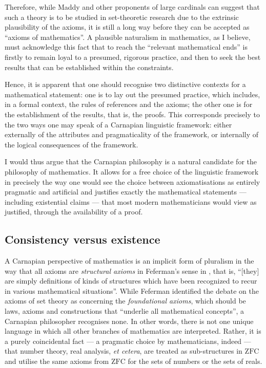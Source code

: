 \documentclass[12pt]{article}
\theoremstyle{plain}
\theoremstyle{definition}
\newcommand{\ZFC}{\mathrm{ZFC}}
\begin{document}
Therefore, while Maddy and other proponents of large cardinals can suggest that such a theory is to be studied in set-theoretic research due to the extrinsic plausibility of the axioms, it is still a long way before they can be accepted as ``axioms of mathematics''. A plausible naturalism in mathematics, as I believe, must acknowledge this fact that to reach the ``relevant mathematical ends'' is firstly to remain loyal to a presumed, rigorous practice, and then to seek the best results that can be established within the constraints.

Hence, it is apparent that one should recognise two distinctive contexts for a mathematical statement: one is to lay out the presumed practice, which includes, in a formal context, the rules of references and the axioms; the other one is for the establishment of the results, that is, the proofs. This corresponds precisely to the two ways one may speak of a Carnapian linguistic framework: either externally of the attributes and pragmaticality of the framework, or internally of the logical consequences of the framework.

I would thus argue that the Carnapian philosophy is a natural candidate for the philosophy of mathematics. It allows for a free choice of the linguistic framework in precisely the way one would see the choice between axiomatisations as entirely pragmatic and artificial and justifies exactly the mathematical statements --- including existential claims --- that most modern mathematicians would view as justified, through the availability of a proof.

\subsection{Consistency versus existence}

A Carnapian perspective of mathematics is an implicit form of pluralism in the way that all axioms are \emph{structural axioms} in Feferman's sense in \cite{feferman-new-axioms}, that is, ``[they] are simply definitions of kinds of structures which have been recognized to recur in various mathematical situations''. While Feferman identified the debate on the axioms of set theory as concerning the \emph{foundational axioms}, which should be laws, axioms and constructions that ``underlie all mathematical concepts'', a Carnapian philosopher recognises none. In other words, there is not one unique language in which all other branches of mathematics are interpreted. Rather, it is a purely coincidental fact --- a pragmatic choice by mathematicians, indeed --- that number theory, real analysis, \emph{et cetera}, are treated as sub-structures in $\ZFC$ and utilise the same axioms from $\ZFC$ for the sets of numbers or the sets of reals.
\end{document}
